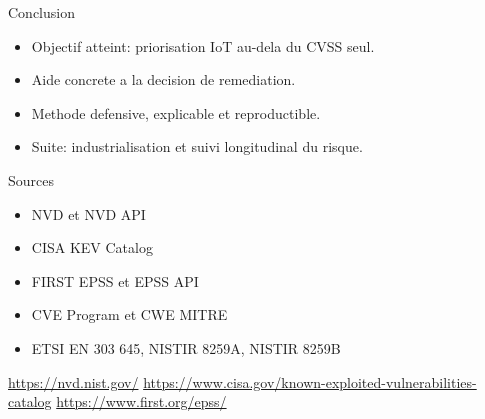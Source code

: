 \documentclass[aspectratio=169,11pt]{beamer}
\begin{document}
\begin{frame}{Conclusion}
\begin{itemize}
  \item Objectif atteint: priorisation IoT au-dela du CVSS seul.
  \item Aide concrete a la decision de remediation.
  \item Methode defensive, explicable et reproductible.
  \item Suite: industrialisation et suivi longitudinal du risque.
\end{itemize}
\end{frame}

\begin{frame}{Sources}
\footnotesize
\begin{itemize}
  \item NVD et NVD API
  \item CISA KEV Catalog
  \item FIRST EPSS et EPSS API
  \item CVE Program et CWE MITRE
  \item ETSI EN 303 645, NISTIR 8259A, NISTIR 8259B
\end{itemize}

\tiny
\url{https://nvd.nist.gov/} \quad
\url{https://www.cisa.gov/known-exploited-vulnerabilities-catalog} \quad
\url{https://www.first.org/epss/}
\end{frame}
\end{document}
